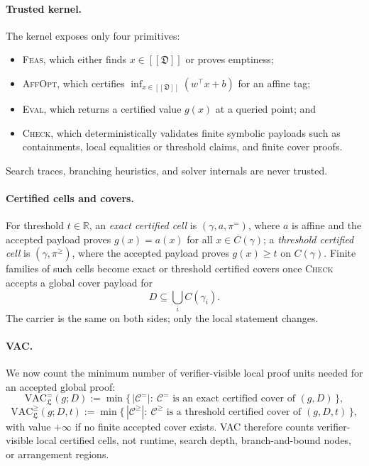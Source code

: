\documentclass{article}
\begin{document}
\paragraph{Trusted kernel.}
The kernel exposes only four primitives:
\begin{itemize}
    \item \textsc{Feas}, which either finds $x\in[\![\mathfrak D]\!]$ or proves emptiness;
    \item \textsc{AffOpt}, which certifies $\inf_{x\in[\![\mathfrak D]\!]}(w^\top x+b)$ for an affine tag;
    \item \textsc{Eval}, which returns a certified value $g(x)$ at a queried point; and
    \item \textsc{Check}, which deterministically validates finite symbolic payloads such as containments, local equalities or threshold claims, and finite cover proofs.
\end{itemize}
Search traces, branching heuristics, and solver internals are never trusted.

\paragraph{Certified cells and covers.}
For threshold $t\in\mathbb R$, an \emph{exact certified cell} is $(\gamma,a,\pi^{=})$, where $a$ is affine and the accepted payload proves $g(x)=a(x)$ for all $x\in C(\gamma)$; a \emph{threshold certified cell} is $(\gamma,\pi^{\ge})$, where the accepted payload proves $g(x)\ge t$ on $C(\gamma)$. Finite families of such cells become exact or threshold certified covers once \textsc{Check} accepts a global cover payload for
\[
D\subseteq \bigcup_i C(\gamma_i).
\]
The carrier is the same on both sides; only the local statement changes.

\paragraph{VAC.}
We now count the minimum number of verifier-visible local proof units needed for an accepted global proof:
\[
\mathrm{VAC}^{=}_{\mathfrak L}(g;D) := \min\{\,|\mathcal C^{=}|:\ \mathcal C^{=}\text{ is an exact certified cover of }(g,D)\,\},
\]
\[
\mathrm{VAC}^{\ge}_{\mathfrak L}(g;D,t) := \min\{\,|\mathcal C^{\ge}|:\ \mathcal C^{\ge}\text{ is a threshold certified cover of }(g,D,t)\,\},
\]
with value $+\infty$ if no finite accepted cover exists. VAC therefore counts verifier-visible local certified cells, not runtime, search depth, branch-and-bound nodes, or arrangement regions.
\end{document}
